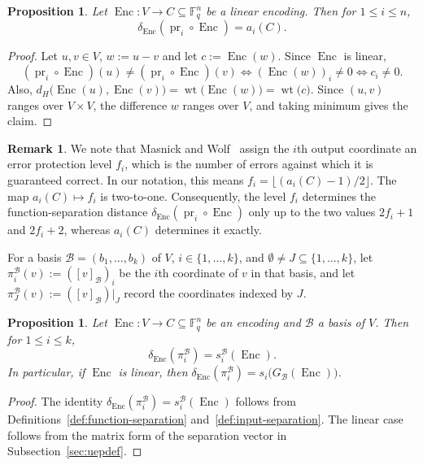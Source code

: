 \documentclass[a4paper,12pt]{article}
\theoremstyle{plain}
\newtheorem{proposition}[lemma]{Proposition}
\theoremstyle{definition}
\newtheorem{remark}[lemma]{Remark}
\newcommand{\F}{\mathbb F}
\newcommand{\wt}{\operatorname{wt}}
\newcommand{\Enc}{\operatorname{Enc}}
\newcommand{\pr}{\operatorname{pr}}
\begin{document}
\begin{proposition}\label{thm:output-uep}
Let $\Enc\colon V\to C\subseteq\F_q^n$ be a linear encoding. Then for $1 \le i \le n$, 
\[
\delta_{\Enc}(\pr_i\circ\Enc)=a_i(C).
\]
\end{proposition}

\begin{proof} Let $u,v \in V$,  $w:=u-v$ and let $c:=\Enc(w)$. 
Since $\Enc$ is linear,  
\[ 
(\pr_i\circ\Enc)(u)\neq(\pr_i\circ\Enc)(v)
 \iff (\Enc(w))_i\neq0 \iff c_i \ne 0. 
\]
Also, $d_H\bigl(\Enc(u),\Enc(v)\bigr)=\wt\bigl(\Enc(w)\bigr)=\wt\bigl(c\bigr)$.
Since $(u,v)$ ranges over $V \times V$, the difference $w$ ranges over $V$, and taking minimum gives the claim.
\end{proof}

\begin{remark}\label{rem:masnick-wolf-level}
We note that Masnick and Wolf~\cite{masnick1967} assign the $i$th output coordinate an error protection level $f_i$, which is the number of errors against which it
is guaranteed correct. 
In our notation, this means $f_i=\lfloor(a_i(C)-1)/2\rfloor$.
The map $a_i(C)\mapsto f_i$ is two-to-one. 
Consequently, the level $f_i$ determines the function-separation distance $\delta_{\Enc}(\pr_i\circ\Enc)$ only up to the two values $2f_i+1$ and
$2f_i+2$, whereas $a_i(C)$ determines it exactly.
\end{remark}

 For a basis $\mathcal B=(b_1,\dots,b_k)$ of $V$, $i\in\{1,\dots,k\}$, and
$\emptyset\neq J\subseteq\{1,\dots,k\}$, let
$\pi_i^{\mathcal B}(v):=([v]_{\mathcal B})_i$ be the $i$th coordinate of
$v$ in that basis, and let $\pi_J^{\mathcal B}(v):=([v]_{\mathcal B})|_J$
record the coordinates indexed by $J$.

\begin{proposition}\label{thm:input-uep}
Let $\Enc\colon V\to C\subseteq\F_q^n$ be an encoding and $\mathcal B$ a basis of
$V$. Then for $1\le i\le k$,
\[
\delta_{\Enc}(\pi_i^{\mathcal B})=s_i^{\mathcal B}(\Enc).
\]
In particular, if $\Enc$ is linear, then
$\delta_{\Enc}(\pi_i^{\mathcal B})=s_i\bigl(G_{\mathcal B}(\Enc)\bigr)$.
\end{proposition}

\begin{proof}
The identity $\delta_{\Enc}(\pi_i^{\mathcal B})=s_i^{\mathcal B}(\Enc)$ follows from
Definitions~\ref{def:function-separation}
and~\ref{def:input-separation}. The linear case follows from the
matrix form of the separation vector in
Subsection~\ref{sec:uepdef}.
\end{proof}
\end{document}
